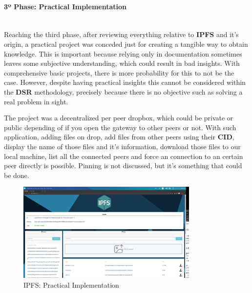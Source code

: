 \paragraph{3º Phase: Practical Implementation}\mbox{}\\
Reaching the third phase, after reviewing everything relative to \textbf{IPFS} and it's origin, a practical project was conceded just for creating a tangible way to obtain knowledge. This is important because relying only in documentation sometimes leaves some subjective understanding, which could result in bad insights. With comprehensive basic projects, there is more probability for this to not be the case. However, despite having practical insights this cannot be considered within the \textbf{DSR} methodology, precisely because there is no objective such as solving a real problem in sight.

The project was a decentralized per peer dropbox, which could be private or public depending of if you open the gateway to other peers or not. With such application, adding files on drop, add files from other peers using their \textbf{CID}, display the name of those files and it's information, download those files to our local machine, list all the connected peers and force an connection to an certain peer directly is possible. Pinning is not discussed, but it's something that could be done.

\begin{figure}[H]
    \centering
    \includegraphics[width=0.8\textwidth]{assets/use-case-1/ipfshow.png} %
    \caption{IPFS: Practical Implementation}
    \label{fig:sample-image} 
\end{figure}


